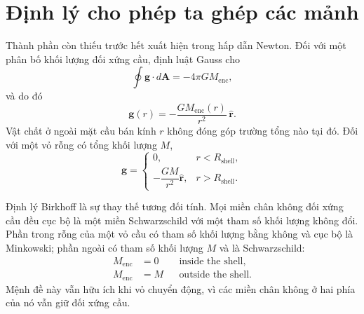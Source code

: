 \section{Định lý cho phép ta ghép các mảnh}

Thành phần còn thiếu trước hết xuất hiện trong hấp dẫn Newton. Đối với một phân bố khối lượng đối xứng cầu, định luật Gauss cho
\begin{equation}
\oint\mathbf g\cdot d\mathbf A=-4\pi G M_{\mathrm{enc}},
\end{equation}
và do đó
\begin{equation}
\mathbf g(r)=-\frac{G M_{\mathrm{enc}}(r)}{r^2}\,\hat{\mathbf r}.
\label{eq:l05-shell-theorem}
\end{equation}
Vật chất ở ngoài mặt cầu bán kính \(r\) không đóng góp trường tổng nào tại đó. Đối với một vỏ rỗng có tổng khối lượng \(M\),
\begin{equation}
\mathbf g=
\begin{cases}
0, & r<R_{\mathrm{shell}},\\[3pt]
-\dfrac{GM}{r^2}\hat{\mathbf r}, & r>R_{\mathrm{shell}}.
\end{cases}
\end{equation}

Định lý Birkhoff là sự thay thế tương đối tính. Mọi miền chân không đối xứng cầu đều cục bộ là một miền Schwarzschild với một tham số khối lượng không đổi. Phần trong rỗng của một vỏ cầu có tham số khối lượng bằng không và cục bộ là Minkowski; phần ngoài có tham số khối lượng \(M\) và là Schwarzschild:
\begin{equation}
\begin{aligned}
M_{\mathrm{enc}}&=0 && \text{inside the shell},\\
M_{\mathrm{enc}}&=M && \text{outside the shell}.
\end{aligned}
\label{eq:l05-birkhoff}
\end{equation}
Mệnh đề này vẫn hữu ích khi vỏ chuyển động, vì các miền chân không ở hai phía của nó vẫn giữ đối xứng cầu.



